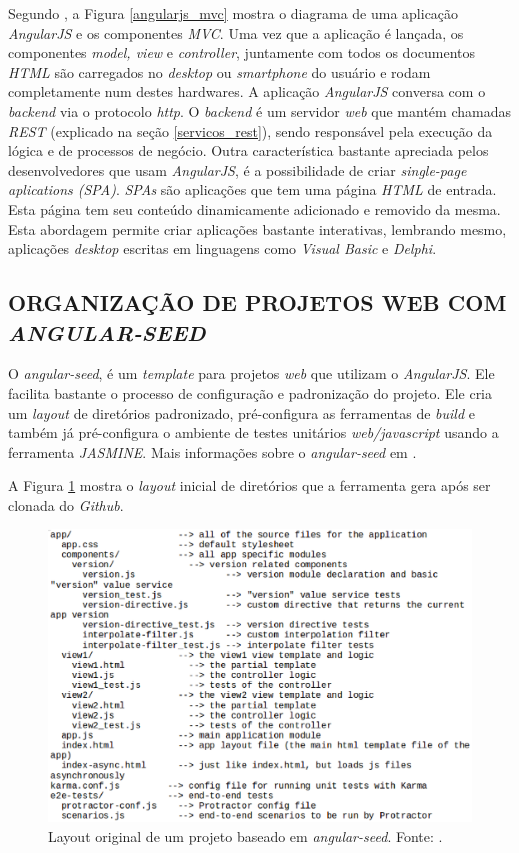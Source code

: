 Segundo , a Figura \ref{angularjs_mvc} mostra o diagrama de uma aplicação \emph{AngularJS} e os componentes \emph{MVC}.  Uma vez que a aplicação é lançada, os componentes \emph{model, view} e \emph{controller}, juntamente com todos os documentos \emph{HTML} são carregados no \emph{desktop} ou \emph{smartphone} do usuário e rodam completamente num destes hardwares.  A aplicação \emph{AngularJS} conversa com o \emph{backend} via o protocolo \emph{http}.  O \emph{backend} é um servidor \emph{web} que mantém chamadas \emph{REST} (explicado na seção \ref{servicos_rest}), sendo responsável pela execução da lógica e de processos de negócio.  
Outra característica bastante apreciada pelos desenvolvedores que usam \emph{AngularJS}, é a possibilidade de criar \emph{single-page aplications (SPA)}. 
\emph{SPAs} são aplicações que tem uma página \emph{HTML} de entrada. 
Esta página tem seu conteúdo dinamicamente adicionado e removido da mesma.
Esta abordagem permite criar aplicações bastante interativas, lembrando mesmo, aplicações \emph{desktop} escritas em linguagens como \emph{Visual Basic} e \emph{Delphi}.

\subsection{ORGANIZAÇÃO DE PROJETOS WEB COM \emph{ANGULAR-SEED}}
\label{angular_seed}

O \emph{angular-seed}, é um \emph{template} para projetos \emph{web} que utilizam o \emph{AngularJS}. 
Ele facilita bastante o processo de configuração e padronização do projeto. 
Ele cria um \emph{layout} de diretórios padronizado, pré-configura as ferramentas de \emph{build} e também já pré-configura o ambiente de testes unitários \emph{web/javascript} usando a ferramenta \emph{JASMINE}. 
Mais informações sobre o \emph{angular-seed} em .

A Figura \ref{seed} mostra o \emph{layout} inicial de diretórios que a ferramenta gera após ser clonada do \emph{Github}.

\begin{figure}[ht]
	\centering
	\includegraphics[width=14cm]{figuras/seed.eps}
	\caption{Layout original de um projeto baseado em \emph{angular-seed}. Fonte: .}
	\label{seed}
\end{figure}

